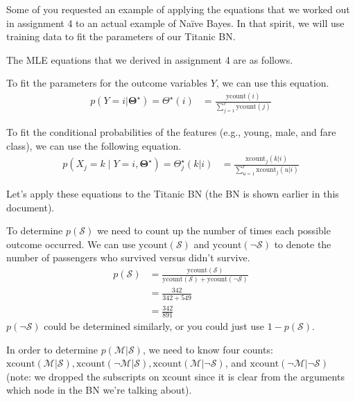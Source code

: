 \documentclass{tufte-handout}
\begin{document}
Some of you requested an example of applying the equations that we worked out in assignment 4 to an actual example of Na\"ive Bayes.  In that spirit, we will use training data to fit the parameters of our Titanic BN.


The MLE equations that we derived in assignment 4 are as follows.

\bi
\item To fit the parameters for the outcome variables $Y$, we can use this equation.
\begin{align}
p(Y=i |  \mathbf{\Theta^\star}) = \Theta^\star(i) &= \frac{\mbox{ycount}(i)}{\sum_{j=1}^c \mbox{ycount}(j)}
\end{align}
\item  To fit the conditional probabilities of the features (e.g., young, male, and fare class), we can use the following equation.
\begin{align}
p(X_j = k \mid Y=i , \mathbf{\Theta^\star}) = \Theta_j^\star(k|i) &= \frac{\mbox{xcount}_j(k|i)}{\sum_{u=1}^r \mbox{xcount}_j(u|i)}
\end{align}
\ei

Let's apply these equations to the Titanic BN (the BN is shown earlier in this document).

\bi
\item To determine $p(\mathcal{S})$ we need to count up the number of times each possible outcome occurred.  We can use $\mbox{ycount}(\mathcal{S})$ and  $\mbox{ycount}(\neg \mathcal{S})$ to denote the number of passengers who survived versus didn't survive.
\begin{align}
p(\mathcal{S}) &= \frac{\mbox{ycount}(\mathcal{S})}{\mbox{ycount}(\mathcal{S}) + \mbox{ycount}(\neg \mathcal{S})} \nonumber \\
&= \frac{342}{342+549} \nonumber \\
&= \frac{342}{891} \nonumber
\end{align}
$p(\neg \mathcal{S})$ could be determined similarly, or you could just use $1-p(\mathcal{S})$.

\item In order to determine $p(\mathcal{M} | \mathcal{S})$, we need to know four counts: $\mbox{xcount}(\mathcal{M}| \mathcal{S}), \mbox{xcount}(\neg \mathcal{M}| \mathcal{S}), \mbox{xcount}(\mathcal{M}|\neg \mathcal{S})$, and $\mbox{xcount}(\neg \mathcal{M}|\neg \mathcal{S})$ (note: we dropped the subscripts on $\mbox{xcount}$ since it is clear from the arguments which node in the BN we're talking about).
\end{document}

